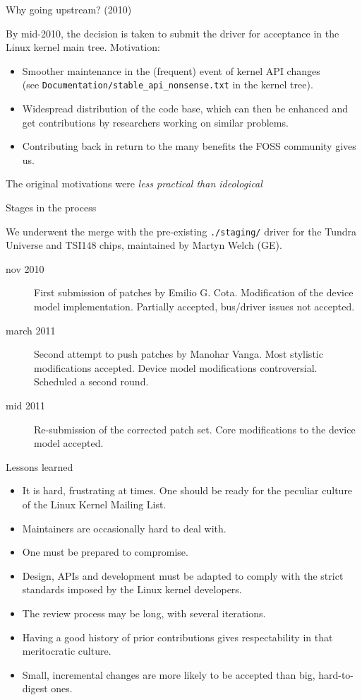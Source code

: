 \documentclass{beamer}
\begin{document}
\begin{frame}{Why going upstream? (2010)}

By mid-2010, the decision is taken to submit the driver for acceptance
in the Linux kernel main tree. Motivation:

\begin{itemize}
\item Smoother maintenance in the (frequent) event of kernel API
  changes\\
  (see \texttt{Documentation/stable\_api\_nonsense.txt} in the kernel
  tree).
\item Widespread distribution of the code base, which can then be
    enhanced and get contributions by researchers working on similar
    problems.
\item Contributing back in return to the many benefits the FOSS community
    gives us.
\end{itemize}
The original motivations were \emph{less practical than ideological}
\end{frame}

\begin{frame}{Stages in the process}

We underwent the merge with the pre-existing \texttt{./staging/}
driver for the Tundra Universe and TSI148 chips,
maintained by Martyn Welch (GE).

\begin{description}
\item[nov 2010] First submission of patches by Emilio G. Cota.
    Modification of the device model implementation. Partially accepted,
    bus/driver issues not accepted.
\item[march 2011] Second attempt to push patches by Manohar Vanga.
    Most stylistic modifications accepted. Device model modifications
    controversial. Scheduled a second round.
\item[mid 2011] Re-submission of the corrected patch set. Core
    modifications to the device model accepted.
\end{description}
\end{frame}

\begin{frame}{Lessons learned}
\begin{itemize}
\item It is hard, frustrating at times. One should be ready for the
    peculiar culture of the Linux Kernel Mailing List.
\item Maintainers are occasionally hard to deal with.
\item One must be prepared to compromise.
\item Design, APIs and development must be adapted to comply with the strict
    standards imposed by the Linux kernel developers.
\item The review process may be long, with several iterations.
\item Having a good history of prior contributions gives respectability
    in that meritocratic culture.
\item Small, incremental changes are more likely to be accepted than
    big, hard-to-digest ones.
\end{itemize}
\end{frame}
\end{document}
